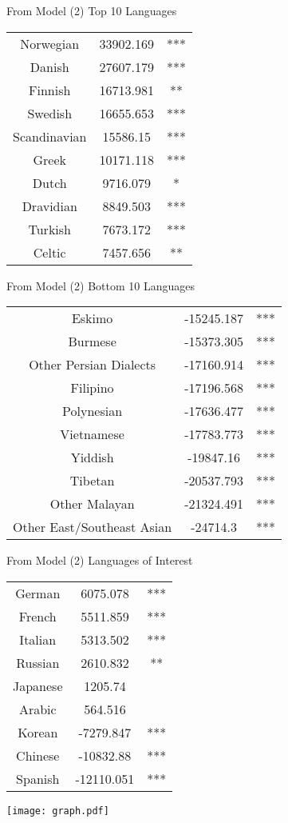 \documentclass[12pt,english]{article}
\begin{document}
From Model (2)
Top 10 Languages


\begin{tabular}{ c|c|c }
 Norwegian & 33902.169 & *** \\ 
 Danish & 27607.179 & *** \\  
 Finnish & 16713.981 & **\\
 Swedish & 16655.653 & *** \\
 Scandinavian & 15586.15 & *** \\
 Greek & 10171.118 & *** \\
 Dutch & 9716.079 & *\\
 Dravidian & 8849.503 & ***\\
 Turkish & 7673.172 & ***\\
 Celtic & 7457.656 &** \\
 \end{tabular}



From Model (2)
Bottom 10 Languages

 \begin{center}
\begin{tabular}{ c|c|c }
 Eskimo & -15245.187 & *** \\ 
 Burmese & -15373.305 & *** \\  
 Other Persian Dialects & -17160.914 & ***\\
 Filipino & -17196.568 & *** \\
 Polynesian & -17636.477 & *** \\
 Vietnamese & -17783.773 & *** \\
 Yiddish & -19847.16 & ***\\
 Tibetan & -20537.793 & ***\\
 Other Malayan & -21324.491 & ***\\
 Other East/Southeast Asian & -24714.3 &*** \\

 
\end{tabular}
\end{center}   

From Model (2)
Languages of Interest

 \begin{center}
\begin{tabular}{ c|c|c }
 German & 6075.078 & *** \\ 
 French & 5511.859 & *** \\  
 Italian & 5313.502 & ***\\
 Russian & 2610.832 & ** \\
 Japanese & 1205.74 &  \\
 Arabic & 564.516 &  \\
 Korean & -7279.847 & ***\\
 Chinese & -10832.88 & ***\\
 Spanish & -12110.051 & ***\\

\end{tabular}
\end{center}   


\texttt{[image: graph.pdf]}
\end{document}
